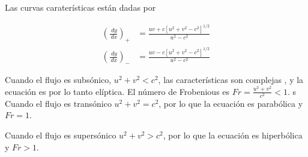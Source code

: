 Las curvas caraterísticas están dadas por 

\begin{align*}
\left( \frac{\,dy}{\,dx} \right)_+ &= \frac{uv + c[u^2+v^2-c^2]^{1/2}}{u^2 - c^2}		\\
\left( \frac{\,dy}{\,dx} \right)_- &= \frac{uv - c[u^2+v^2-c^2]^{1/2}}{u^2 - c^2}
\end{align*}

Cuando el flujo es subsónico, $u^2+v^2<c^2$, las características son complejas , y la ecuación es por lo tanto elíptica. El número de Frobenious es $Fr = \frac{u^2 + v^2}{c^2} < 1 $.
s
Cuando el flujo es transónico $u^2+v^2=c^2$, por lo que la ecuación es parabólica y $Fr = 1$.

Cuando el flujo es supersónico $u^2+v^2>c^2$, por lo que la ecuación es hiperbólica y $Fr > 1$.






